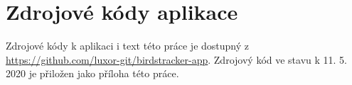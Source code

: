 \chapter{Zdrojové kódy aplikace}

Zdrojové kódy k aplikaci i text této práce je dostupný z \url{https://github.com/luxor-git/birdstracker-app}. Zdrojový kód ve stavu k 11. 5. 2020 je přiložen jako příloha této práce.